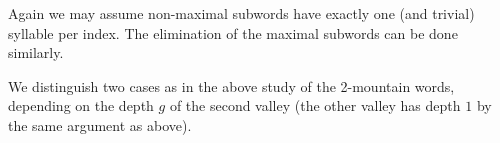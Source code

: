 
% 
% 
% 

Again we may assume non-maximal subwords have exactly one (and trivial)
syllable per index. The elimination of the maximal subwords can be done
similarly. %

We distinguish two cases as in the above study of the 2-mountain
words, depending on the depth $g$ of the second valley (the
other valley has depth $1$ by the same argument as above).


